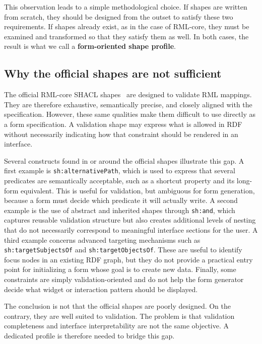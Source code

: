 This observation leads to a simple methodological choice.
If shapes are written from scratch, they should be designed from the outset to satisfy these two requirements.
If shapes already exist, as in the case of RML-core, they must be examined and transformed so that they satisfy them as well.
In both cases, the result is what we call a \textbf{form-oriented shape profile}.

\subsection{Why the official shapes are not sufficient}

The official RML-core SHACL shapes~\cite{kg:rmlcore} are designed to validate RML mappings.
They are therefore exhaustive, semantically precise, and closely aligned with the specification.
However, these same qualities make them difficult to use directly as a form specification.
A validation shape may express what is allowed in RDF without necessarily indicating how that constraint should be rendered in an interface.

Several constructs found in or around the official shapes illustrate this gap.
A first example is \texttt{sh:alternativePath}, which is used to express that several predicates are semantically acceptable, such as a shortcut property and its long-form equivalent.
This is useful for validation, but ambiguous for form generation, because a form must decide which predicate it will actually write.
A second example is the use of abstract and inherited shapes through \texttt{sh:and}, which captures reusable validation structure but also creates additional levels of nesting that do not necessarily correspond to meaningful interface sections for the user.
A third example concerns advanced targeting mechanisms such as \texttt{sh:targetSubjectsOf} and \texttt{sh:targetObjectsOf}.
These are useful to identify focus nodes in an existing RDF graph, but they do not provide a practical entry point for initializing a form whose goal is to create new data.
Finally, some constraints are simply validation-oriented and do not help the form generator decide what widget or interaction pattern should be displayed.

The conclusion is not that the official shapes are poorly designed.
On the contrary, they are well suited to validation.
The problem is that validation completeness and interface interpretability are not the same objective.
A dedicated profile is therefore needed to bridge this gap.

